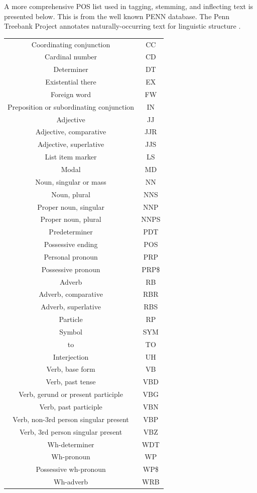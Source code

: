 A more comprehensive POS list used in tagging, stemming, and inflecting text is presented below.
This is from the well known PENN database.  The Penn Treebank Project annotates naturally-occurring text for linguistic structure \cite{PENNTREEBANK}.
\begin{tiny}
\begin{tabular}{|c|c|}
  \hline
Coordinating conjunction	&	CC	\\
Cardinal number	&	CD	\\
Determiner	&	DT	\\
Existential there 	&	EX	\\
Foreign word	&	FW	\\
Preposition or subordinating conjunction	&	IN	 \\
Adjective	&	JJ	\\
Adjective, comparative	&	JJR	\\
Adjective, superlative	&	JJS	\\
List item marker	&	LS	\\
Modal	&	MD	\\
Noun, singular or mass	&	NN	\\
Noun, plural	&	NNS	\\
Proper noun, singular	&	NNP	\\
Proper noun, plural	&	NNPS	\\
Predeterminer	&	PDT	\\
Possessive ending	&	POS	\\
Personal pronoun	&	PRP	\\
Possessive pronoun	&	PRP\$	\\
Adverb	&	RB	\\
Adverb, comparative	&	RBR	\\
Adverb, superlative	&	RBS	\\
Particle	&	RP	\\
Symbol	&	SYM	\\
to	&	TO	\\
Interjection	&	UH	\\
Verb, base form	&	VB	\\
Verb, past tense	&	VBD	\\
Verb, gerund or present participle	&	VBG	\\
Verb, past participle	&	VBN	\\
Verb, non-3rd person singular present	&	VBP	\\
Verb, 3rd person singular present	&	VBZ	\\
Wh-determiner	&	WDT	\\
Wh-pronoun	&	WP	\\
Possessive wh-pronoun	&	WP\$	\\
Wh-adverb	&	WRB	\\
  \hline
\end{tabular}
\end{tiny}

